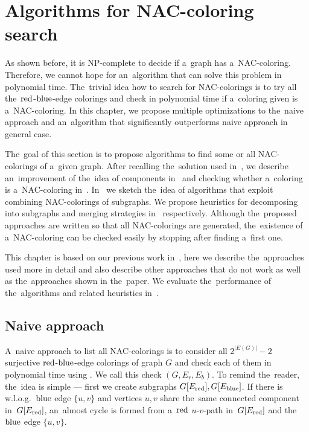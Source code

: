 \chapter{Algorithms for NAC-coloring search}%
\label{chapter:algo}

\begin{chapterabstract}

	As shown before, it is NP-complete to decide if a~graph has a~NAC-coloring.
	Therefore, we cannot hope for an~algorithm that can solve this problem in polynomial time.
	The~trivial idea how to search for NAC-colorings is to
	try all the~\( \text{red} \)-\( \text{blue} \)-edge colorings
	and check in polynomial time if a~coloring given is a~NAC-coloring.
	In this chapter, we propose multiple optimizations to the~naive approach
	and an~algorithm that significantly outperforms naive approach in general case.

\end{chapterabstract}

The~goal of this section is to propose algorithms to find some or all NAC-colorings of a~given graph.
After recalling the~solution used in~\flexrilog{},
we describe an~improvement of the~idea of \trcon{} components in~
and checking whether a~coloring is a~NAC-coloring in~.
In~ we sketch the~idea of algorithms that
exploit combining NAC-colorings of subgraphs.
We propose heuristics for decomposing into subgraphs and merging strategies
in~ respectively.
Although the~proposed approaches are written so that all NAC-colorings are generated,
the~existence of a~NAC-coloring can be checked easily by stopping after finding a~first one.

This chapter is based on our previous work in~\cite{my_paper},
here we describe the~approaches used more in detail
and also describe other approaches that do not work as well as the~approaches
shown in the~paper. We evaluate the~performance
of the~algorithms and related heuristics in~.

\section{Naive approach}

A~naive approach to list all NAC-colorings is to consider
all $2^{|E(G)|} - 2$ surjective \( \text{red} \)-\( \text{blue} \)-edge colorings of graph $G$
and check each of them in polynomial time using .
We call this check \IsNACColoring{}$(G, E_r, E_b)$.
To remind the~reader, the~idea is simple
--- first we create subgraphs \( G[E_{\text{red}}], G[E_{\text{blue}}] \).
If there is w.l.o.g.\ \( \text{blue} \) edge \( \{u, v\} \)
and vertices \( u, v \) share the~same connected component in~\( G[E_{\text{red}}] \),
an~almost cycle is formed from a~\( \text{red} \) \( u \)-\( v \)-path in~\( G[E_{\text{red}}] \)
and the~\( \text{blue} \) edge \( \{u, v\} \).

